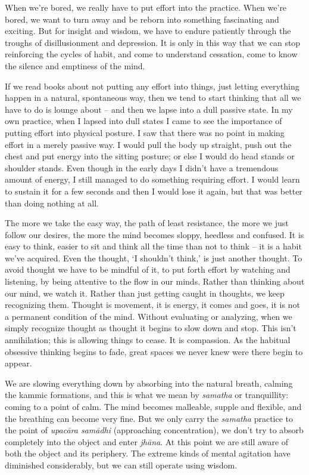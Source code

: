 When we're bored, we really have to put effort into the practice. When we're bored, we want to turn away and be reborn into something fascinating and exciting. But for insight and wisdom, we have to endure patiently through the troughs of disillusionment and depression. It is only in this way that we can stop reinforcing the cycles of habit, and come to understand cessation, come to know the silence and emptiness of the mind.

If we read books about not putting any effort into things, just letting everything happen in a natural, spontaneous way, then we tend to start thinking that all we have to do is lounge about -- and then we lapse into a dull passive state. In my own practice, when I lapsed into dull states I came to see the importance of putting effort into physical posture. I saw that there was no point in making effort in a merely passive way. I would pull the body up straight, push out the chest and put energy into the sitting posture; or else I would do head stands or shoulder stands. Even though in the early days I didn't have a tremendous amount of energy, I still managed to do something requiring effort. I would learn to sustain it for a few seconds and then I would lose it again, but that was better than doing nothing at all.

The more we take the easy way, the path of least resistance, the more we just follow our desires, the more the mind becomes sloppy, heedless and confused. It is easy to think, easier to sit and think all the time than not to think -- it is a habit we've acquired. Even the thought, `I shouldn't think,' is just another thought. To avoid thought we have to be mindful of it, to put forth effort by watching and listening, by being attentive to the flow in our minds. Rather than thinking about our mind, we watch it. Rather than just getting caught in thoughts, we keep recognizing them. Thought is movement, it is energy, it comes and goes, it is not a \mbox{permanent} \mbox{condition} of the mind. Without evaluating or analyzing, when we simply recognize thought as thought it begins to slow down and stop. This isn't annihilation; this is allowing things to cease. It is compassion. As the habitual obsessive thinking begins to fade, great spaces we never knew were there begin to appear.

We are slowing everything down by absorbing into the natural breath, calming the kammic formations, and this is what we mean by \textit{samatha} or tranquillity: coming to a point of calm. The mind becomes malleable, supple and flexible, and the breathing can become very fine. But we only carry the \textit{samatha} practice to the point of \textit{upac\=ara sam\=adhi} (approaching concentration), we don't try to absorb completely into the object and enter \textit{jh\=ana}. At this point we are still aware of both the object and its periphery. The extreme kinds of mental agitation have diminished considerably, but we can still operate using wisdom.

